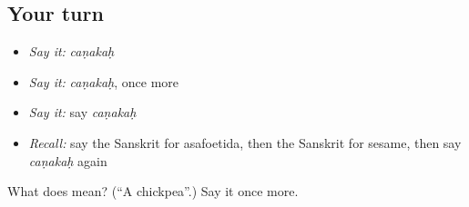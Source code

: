 \subsection*{Your turn}
\begin{itemize}
\raggedright
  \item \emph{Say it:} \emph{caṇakaḥ}
  \item \emph{Say it:} \emph{caṇakaḥ}, once more
  \item \emph{Say it:} say \emph{caṇakaḥ}
  \item \emph{Recall:} say the Sanskrit for asafoetida, then the Sanskrit for sesame, then say \emph{caṇakaḥ} again
\end{itemize}

\begin{tcolorbox}[breakable,colback=teal!4,colframe=teal!35!black,title={Before you move on}]
What does  mean? (\textquotedblleft{}A chickpea\textquotedblright{}.) Say it once more.
\end{tcolorbox}

